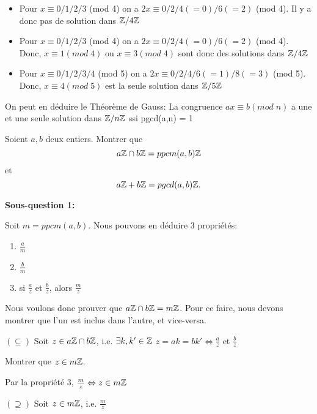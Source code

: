 \begin{itemize}
\item Pour $x \equiv 0 / 1 / 2 / 3$ (mod 4) on a $2x \equiv 0 / 2 / 4(=0) / 6(=2)$ (mod 4). Il y a donc pas de solution dans $\mathbb{Z}/4\mathbb{Z}$

\item Pour $x \equiv 0 / 1 / 2 / 3$ (mod 4) on a $2x \equiv 0 / 2 / 4(=0) / 6(=2)$ (mod 4). Donc, $x \equiv 1 (mod\;4)$ ou $x \equiv 3 (mod\;4)$ sont donc des solutions dans $\mathbb{Z}/4\mathbb{Z}$

\item Pour $x \equiv 0 / 1 / 2 / 3 / 4$ (mod 5) on a $2x \equiv 0 / 2 / 4 / 6(=1) / 8(=3)$ (mod 5). Donc, $x \equiv 4(mod\; 5)$ est la seule solution dans $\mathbb{Z}/5\mathbb{Z}$
\end{itemize}

On peut en déduire le Théorème de Gauss: La congruence $ax \equiv b(mod\; n)$ a une et une seule solution dans $\mathbb{Z}/n\mathbb{Z}$ ssi pgcd(a,n) = 1

\newpage


\vspace*{0.8cm}
\begin{exo}
Soient $a,b$ deux entiers. Montrer que $$a\mathbb{Z} \cap b\mathbb{Z} = ppcm(a,b)\mathbb{Z}$$ et $$ a\mathbb{Z} + b\mathbb{Z} = pgcd(a,b)\mathbb{Z}.$$
\end{exo}

\textbf{Sous-question 1:} 

Soit $m = ppcm(a,b)$. Nous pouvons en déduire 3 propriétés:

\begin{enumerate}
	\item $\frac{a}{m}$
	\item $\frac{b}{m}$
	\item si $\frac{a}{z}$ et $\frac{b}{z}$, alors $\frac{m}{z}$ 
\end{enumerate}

Nous voulons donc prouver que $a\mathbb{Z} \cap b\mathbb{Z} = m\mathbb{Z}$. Pour ce faire, nous devons montrer que l'un est inclus dans l'autre, et vice-versa. 

$(\subseteq)$ Soit $z \in a\mathbb{Z} \cap b\mathbb{Z} $, i.e. $\exists k,{k}' \in \mathbb{Z} $ \hspace{1cm} $z = ak = b{k}' \Leftrightarrow \frac{a}{z}$ et $\frac{b}{z}$ 

Montrer que $z \in m\mathbb{Z}$. 

Par la propriété 3, $\frac{m}{z} \Leftrightarrow z \in m\mathbb{Z}$ 

$(\supseteq)$ Soit $z \in m\mathbb{Z} $, i.e. $\frac{m}{z}$ 

